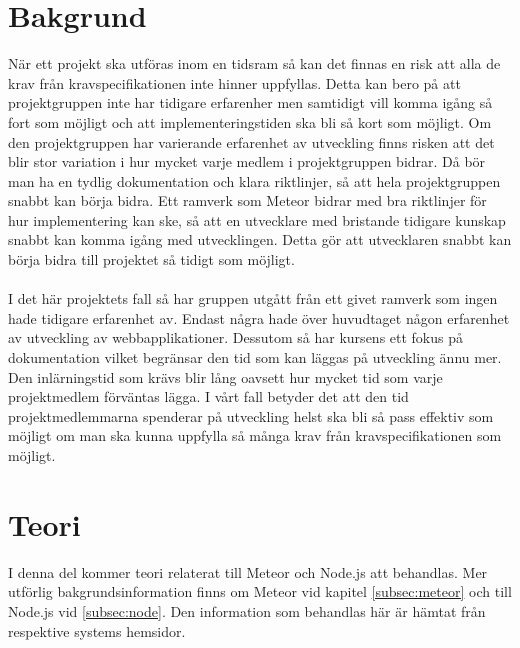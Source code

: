 \section{Bakgrund}
\label{sec:johan_t-bakgrund}
När ett projekt ska utföras inom en tidsram så kan det finnas en risk att alla de krav från kravspecifikationen inte hinner uppfyllas. Detta kan bero på att projektgruppen inte har tidigare erfarenher men samtidigt vill komma igång så fort som möjligt och att implementeringstiden ska bli så kort som möjligt. Om den projektgruppen har varierande erfarenhet av utveckling finns risken att det blir stor variation i hur mycket varje medlem i projektgruppen bidrar. Då bör man ha en tydlig dokumentation och klara riktlinjer, så att hela projektgruppen snabbt kan börja bidra. Ett ramverk som Meteor bidrar med bra riktlinjer för hur implementering kan ske, så att en utvecklare med bristande tidigare kunskap snabbt kan komma igång med utvecklingen. Detta gör att utvecklaren snabbt kan börja bidra till projektet så tidigt som möjligt. 
\\ \\ 
I det här projektets fall så har gruppen utgått från ett givet ramverk som ingen hade tidigare erfarenhet av. Endast några hade över huvudtaget någon erfarenhet av utveckling av webbapplikationer. Dessutom så har kursens ett fokus på dokumentation vilket begränsar den tid som kan läggas på utveckling ännu mer. Den inlärningstid som krävs blir lång oavsett hur mycket tid som varje projektmedlem förväntas lägga. I vårt fall betyder det att den tid projektmedlemmarna spenderar på utveckling helst ska bli så pass effektiv som möjligt om man ska kunna uppfylla så många krav från kravspecifikationen som möjligt.
\section{Teori}
\label{sec:johan_t-teori}
I denna del kommer teori relaterat till Meteor och Node.js att behandlas. Mer utförlig bakgrundsinformation finns om Meteor vid kapitel \ref{subsec:meteor} och till Node.js vid \ref{subsec:node}. Den information som behandlas här är hämtat från respektive systems hemsidor.
